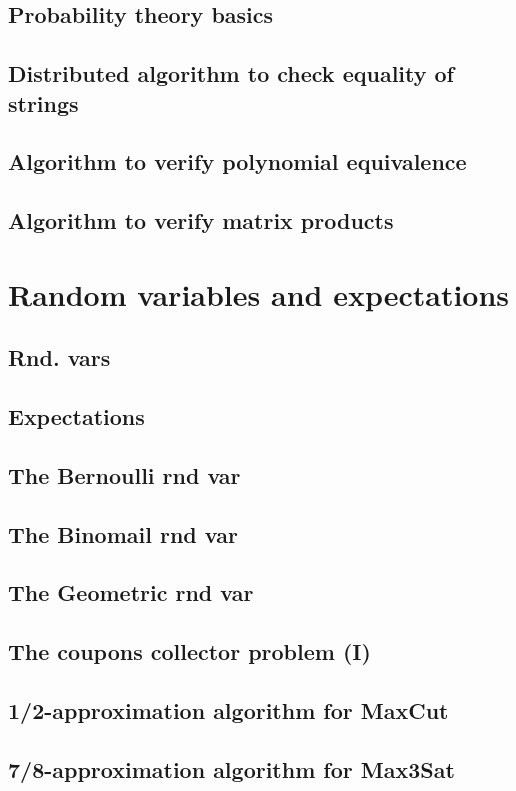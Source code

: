 \documentclass{book}
\begin{document}
\section{Probability theory basics}
\section{Distributed algorithm to check equality of strings}
\section{Algorithm to verify polynomial equivalence}
\section{Algorithm to verify matrix products}

\chapter{Random variables and expectations}
\section{Rnd. vars}
\section{Expectations}
\section{The Bernoulli rnd var}
\section{The Binomail rnd var}
\section{The Geometric rnd var}
\section{The coupons collector problem (I)}
\section{1/2-approximation algorithm for MaxCut}
\section{7/8-approximation algorithm for Max3Sat}
\end{document}
